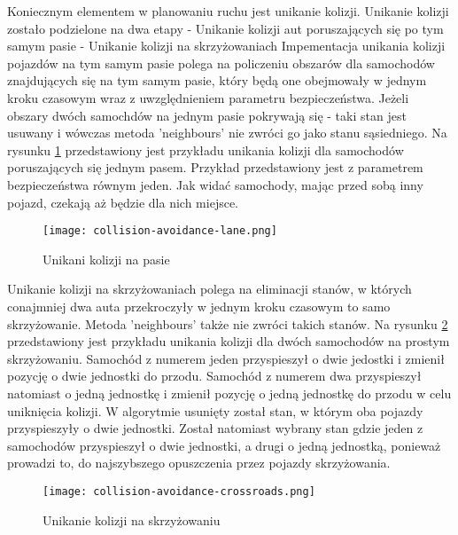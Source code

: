 Koniecznym elementem w planowaniu ruchu jest unikanie kolizji.
\newline
\newline
Unikanie kolizji zostało podzielone na dwa etapy
\newline
- Unikanie kolizji aut poruszających się po tym samym pasie
\newline
- Unikanie kolizji na skrzyżowaniach
\newline
\newline
Impementacja unikania kolizji pojazdów na tym samym pasie polega na policzeniu obszarów dla samochodów znajdujących się na tym samym pasie, który będą one obejmowały w jednym kroku czasowym wraz z uwzględnieniem parametru bezpieczeństwa.
\newline
\newline
Jeżeli obszary dwóch samochdów na jednym pasie pokrywają się - taki stan jest usuwany i wówczas metoda 'neighbours' nie zwróci go jako stanu sąsiedniego.
\newline
\newline
Na rysunku \ref{collision-avoidance-lane} przedstawiony jest przykładu unikania kolizji dla samochodów poruszających się jednym pasem. Przykład przedstawiony jest z parametrem bezpieczeństwa równym jeden.
\newline
Jak widać samochody, mając przed sobą inny pojazd, czekają aż będzie dla nich miejsce.
\begin{figure}
    \texttt{[image: collision-avoidance-lane.png]}
  \caption{Unikani kolizji na pasie}
  \label{collision-avoidance-lane}
\end{figure}
\newpage
Unikanie kolizji na skrzyżowaniach polega na eliminacji stanów, w których conajmniej dwa auta przekroczyły w jednym kroku czasowym to samo skrzyżowanie. Metoda 'neighbours' także nie zwróci takich stanów.
\newline
\newline
Na rysunku \ref{collision-avoidance-crossroads} przedstawiony jest przykładu unikania kolizji dla dwóch samochodów na prostym skrzyżowaniu. Samochód z numerem jeden przyspieszył o dwie jedostki i zmienił pozycję o dwie jednostki do przodu. Samochód z numerem dwa przyspieszył natomiast o jedną jednostkę i zmienił pozycję o jedną jednostkę do przodu w celu uniknięcia kolizji.
\newline
\newline
W algorytmie usunięty został stan, w którym oba pojazdy przyspieszyły o dwie jednostki. Został natomiast wybrany stan gdzie jeden z samochodów przyspieszył o dwie jednostki, a drugi o jedną jednostką, ponieważ prowadzi to, do najszybszego opuszczenia przez pojazdy skrzyżowania.
\begin{figure}
    \texttt{[image: collision-avoidance-crossroads.png]}
  \caption{Unikanie kolizji na skrzyżowaniu}
  \label{collision-avoidance-crossroads}
\end{figure}
\newpage

